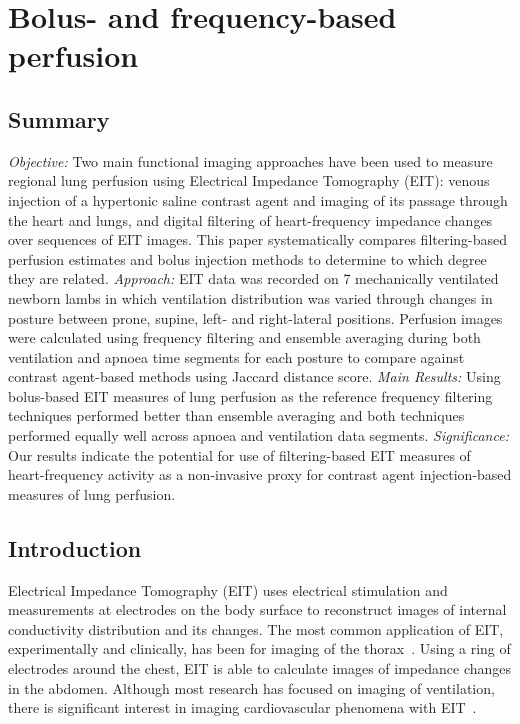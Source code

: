 \chapter{Bolus- and frequency-based perfusion}
\label{chap:chapter-3}

\section{Summary}
    \emph{Objective:} Two main functional imaging approaches have been used to measure regional lung perfusion 
    using Electrical Impedance Tomography (EIT): venous injection of a hypertonic saline contrast
    agent and imaging of its passage through the heart and lungs, and digital filtering 
    of heart-frequency impedance changes over sequences of EIT images.
    This paper systematically compares filtering-based perfusion estimates and 
    bolus injection methods to determine to which degree they are related.
    \emph{Approach:} EIT data was recorded on 7 mechanically ventilated newborn lambs in which 
    ventilation distribution was varied through changes in posture
    between prone, supine, left- and right-lateral positions.
    Perfusion images were calculated using frequency filtering and ensemble averaging 
    during both ventilation and apnoea time segments for each posture to compare against 
    contrast agent-based methods using Jaccard distance score. 
    \emph{Main Results:} Using bolus-based EIT measures of lung perfusion as the reference
    frequency filtering techniques performed better than ensemble averaging
    and both techniques performed equally well across apnoea and ventilation data segments.
    \emph{Significance:} Our results indicate the potential for use of
    filtering-based EIT measures of heart-frequency activity as a non-invasive
    proxy for contrast agent injection-based measures of lung perfusion. 

\section{Introduction}

Electrical Impedance Tomography (EIT) uses electrical stimulation and measurements at electrodes on the
body surface to reconstruct images of internal conductivity
distribution and its changes.
The most common application of EIT, experimentally and clinically,
has been for imaging of the thorax~\parencite{frerichs_chest_2017}.
Using a ring of electrodes around the chest, EIT is able to calculate
images of impedance changes in the abdomen.
Although most research has focused on
imaging of ventilation, there is significant interest in imaging
cardiovascular phenomena with EIT~\parencite{adler_whither_2012,leonhardt_electrical_2012}. 

